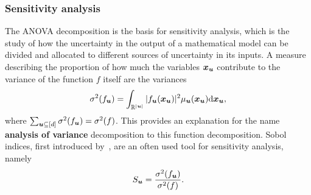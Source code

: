 \documentclass{article}
\renewcommand{\vec}[1]{\ensuremath \mathbf{\boldsymbol{#1}}}
\newcommand{\x}{\ensuremath{\vec x}}
\newcommand{\R}{\ensuremath{\mathbb{R}}}
\newcommand{\dx}{\mathrm{d}}
\theoremstyle{definition}
\numberwithin{equation}{section}
\begin{document}
\subsubsection*{Sensitivity analysis}
The ANOVA decomposition is the basis for sensitivity analysis, which is the study of how the uncertainty in the output of a mathematical model can be divided and allocated to different sources of uncertainty in its inputs. A measure describing the proportion of how much the variables $\x_{\vec u} $ contribute to the variance of the function $f$ itself are the variances
\begin{equation}\label{eq:sigma}
\sigma^2(f_{\vec u}) = \int_{\R^{|\vec u|}}|f_{\vec u}(\x_{\vec u})|^2 \mu_{\vec u}(\x_{\vec u}) \dx \x_{\vec u},
\end{equation}
where $\sum_{\vec u\subseteq [d]} \sigma^2(f_{\vec u}) =  \sigma^2(f)$. This provides an explanation for the name \textbf{analysis of variance} decomposition to this function decomposition. 
Sobol indices, first introduced by~\cite{So95}, are an often used tool for sensitivity analysis, namely
\begin{equation}\label{eq:sobol}
S_{\vec u} = \frac{\sigma^2(f_{\vec u})}{\sigma^2(f)}.
\end{equation}
\end{document}
